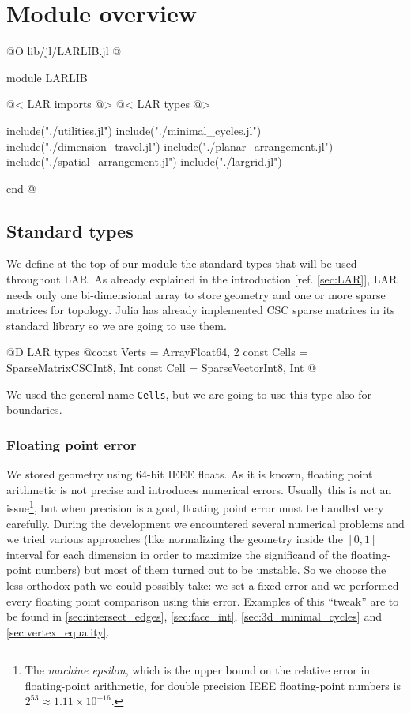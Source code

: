 \chapter{Module overview}

@O lib/jl/LARLIB.jl
@{module LARLIB

    @< LAR imports @>
    @< LAR types @>

    include("./utilities.jl")
    include("./minimal_cycles.jl")
    include("./dimension_travel.jl")
    include("./planar_arrangement.jl")
    include("./spatial_arrangement.jl")
    include("./largrid.jl")
    
end
@}

\section{Standard types}

We define at the top of our module the standard types
that will be used throughout LAR. As already explained
in the introduction [ref. \ref{sec:LAR}], LAR needs
only one bi-dimensional array to store geometry and 
one or more sparse matrices for topology.
Julia has already implemented CSC sparse matrices in
its standard library so we are going to use them.

@D LAR types
@{const Verts = Array{Float64, 2}
const Cells = SparseMatrixCSC{Int8, Int}
const Cell = SparseVector{Int8, Int}
@}

We used the general name \texttt{Cells}, but
we are going to use this type also for boundaries.

\subsection{Floating point error}
\label{sec:floating-point_error}

We stored geometry using 64-bit IEEE floats.
As it is known, floating point arithmetic is not
precise and introduces numerical errors.
Usually this is not an issue\footnote{The \textit{machine epsilon},
which is the upper bound on the relative error in floating-point 
arithmetic, for double precision IEEE floating-point numbers is 
$2^53 \approx 1.11 \times 10^{-16}$.}, but when precision is
a goal, floating point error must be handled very carefully.
During the development we encountered several numerical problems
and we tried various approaches (like normalizing the geometry
inside the $[0, 1]$ interval for each dimension in order to maximize
the significand of the floating-point numbers) but most of them turned 
out to be unstable. So we choose the less orthodox path we could
possibly take: we set a fixed error and we performed every floating point
comparison using this error. Examples of this ``tweak'' are to be found in
\ref{sec:intersect_edges}, \ref{sec:face_int}, \ref{sec:3d_minimal_cycles} and 
\ref{sec:vertex_equality}.

